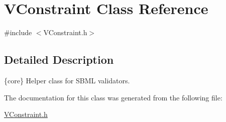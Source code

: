 \hypertarget{class_v_constraint}{}\section{V\+Constraint Class Reference}
\label{class_v_constraint}


{\ttfamily \#include $<$V\+Constraint.\+h$>$}



\subsection{Detailed Description}
\{core\} Helper class for S\+B\+ML validators.

 

The documentation for this class was generated from the following file\+:\begin{DoxyCompactItemize}
\item 
\hyperlink{_v_constraint_8h}{V\+Constraint.\+h}\end{DoxyCompactItemize}
